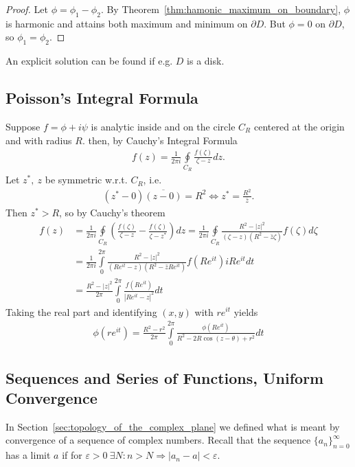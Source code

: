 \documentclass[12pt, a4paper]{article}
\theoremstyle{plain}
\theoremstyle{definition}
\begin{document}
		\begin{proof}
			Let $\phi = \phi_1-\phi_2$. By Theorem~\ref{thm:hamonic_maximum_on_boundary}, $\phi$ is harmonic and attains both maximum and minimum on $\partial D$. But $\phi=0$ on $\partial D$, so $\phi_1=\phi_2$.
		\end{proof}

		An explicit solution can be found if e.g. $D$ is a disk.

		\subsection{Poisson's Integral Formula} %
		\label{sub:poisson_s_integral_formula}
			Suppose $f=\phi+i\psi$ is analytic inside and on the circle $C_R$ centered at the origin and with radius $R$. then, by Cauchy's Integral Formula
			\begin{align*}
				f(z) = \frac{1}{2\pi i}\oint\limits_{C_R}\frac{f(\zeta)}{\zeta-z}dz.
			\end{align*}
			Let $z^*,\:z$ be symmetric w.r.t. $C_R$, i.e.
			\begin{align*}
				(z^*-0)\overline{(z-0)} = R^2 \iff z^* = \frac{R^2}{\bar{z}}.
			\end{align*}
			Then $z^*>R$, so by Cauchy's theorem
			\begin{align*}
				f(z) &= 
				\frac{1}{2\pi i}\oint\limits_{C_R}\left(\frac{f(\zeta)}{\zeta-z}- \frac{f(\zeta)}{\zeta-z^*}\right)dz =
				\frac{1}{2\pi i}\oint\limits_{C_R}\frac{R^2-|z|^2}{(\zeta-z)(R^2-\bar{z}\zeta)} f(\zeta)d \zeta	\\ &=
				\frac{1}{2\pi i}\int\limits_{0}^{2\pi}\frac{R^2-|z|^2}{(Re^{it}-z)(R^2-\bar{z}Re^{it})}f(Re^{it})iRe^{it}dt \\ &=
				\frac{R^2-|z|^2}{2\pi}\int\limits_{0}^{2\pi}\frac{f(Re^{it})}{|Re^{it}-z|^2}dt
			\end{align*}
			Taking the real part and identifying $(x,y)$ with $re^{it}$ yields
			\begin{align*}
				\phi(re^{it}) = \frac{R^2-r^2}{2\pi}\int\limits_{0}^{2\pi}\frac{\phi(Re^{it})}{R^2-2R\cos(z-\theta)+r^2}dt
			\end{align*}
		\subsection{Sequences and Series of Functions, Uniform Convergence} %
		\label{sub:sequences_and_series_of_functions_uniform_convergence}
			In Section~\ref{sec:topology_of_the_complex_plane} we defined what is meant by convergence of a sequence of complex numbers. Recall that the sequence $\{a_n\}_{n=0}^\infty$ has a limit $a$ if for $\varepsilon>0\:\exists N: n>N\Rightarrow |a_n-a|<\varepsilon$.\\
\end{document}
